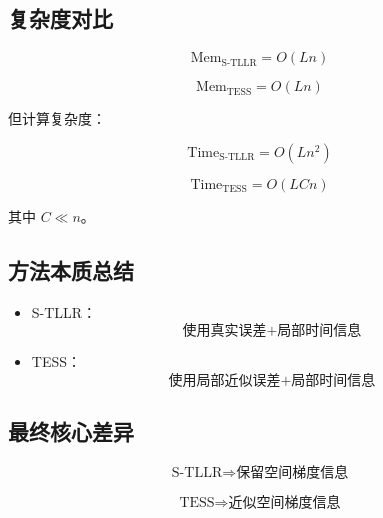 \documentclass[journal,12pt,onecolumn]{IEEEtran}
\begin{document}
\subsection{复杂度对比}

\begin{equation}
\text{Mem}_{\text{S-TLLR}} = O(Ln)
\end{equation}

\begin{equation}
\text{Mem}_{\text{TESS}} = O(Ln)
\end{equation}

但计算复杂度：

\begin{equation}
\text{Time}_{\text{S-TLLR}} = O(Ln^2)
\end{equation}

\begin{equation}
\text{Time}_{\text{TESS}} = O(LCn)
\end{equation}

其中 $C \ll n$。



\subsection{方法本质总结}

\begin{itemize}
\item S-TLLR：
\begin{equation}
\text{使用真实误差} + \text{局部时间信息}
\end{equation}

\item TESS：
\begin{equation}
\text{使用局部近似误差} + \text{局部时间信息}
\end{equation}
\end{itemize}



\subsection{最终核心差异}

\begin{equation}
\text{S-TLLR} \Rightarrow \text{保留空间梯度信息}
\end{equation}

\begin{equation}
\text{TESS} \Rightarrow \text{近似空间梯度信息}
\end{equation}
\end{document}
